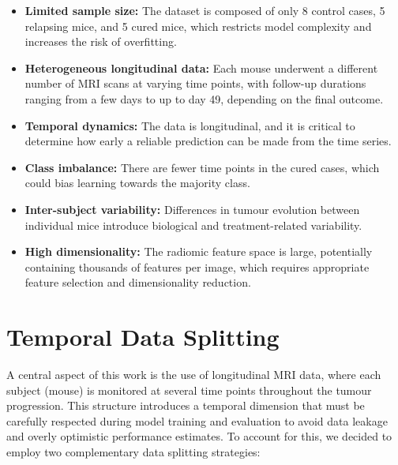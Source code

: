 \documentclass[12pt, a4paper]{report}
\begin{document}
\begin{itemize}
    \item \textbf{Limited sample size:} The dataset is composed of only 8 control cases, 5 relapsing mice, and 5 cured mice, which restricts model complexity and increases the risk of overfitting.
    \item \textbf{Heterogeneous longitudinal data:} Each mouse underwent a different number of MRI scans at varying time points, with follow-up durations ranging from a few days to up to day 49, depending on the final outcome.
    \item \textbf{Temporal dynamics:} The data is longitudinal, and it is critical to determine how early a reliable prediction can be made from the time series.
    \item \textbf{Class imbalance:} There are fewer time points in the cured cases, which could bias learning towards the majority class.
    \item \textbf{Inter-subject variability:} Differences in tumour evolution between individual mice introduce biological and treatment-related variability.
    \item \textbf{High dimensionality:} The radiomic feature space is large, potentially containing thousands of features per image, which requires appropriate feature selection and dimensionality reduction.
\end{itemize}

\section{Temporal Data Splitting}

A central aspect of this work is the use of longitudinal MRI data, where each subject (mouse) is monitored at several time points throughout the tumour progression. This structure introduces a temporal dimension that must be carefully respected during model training and evaluation to avoid data leakage and overly optimistic performance estimates. To account for this, we decided to employ two complementary data splitting strategies:
\end{document}
